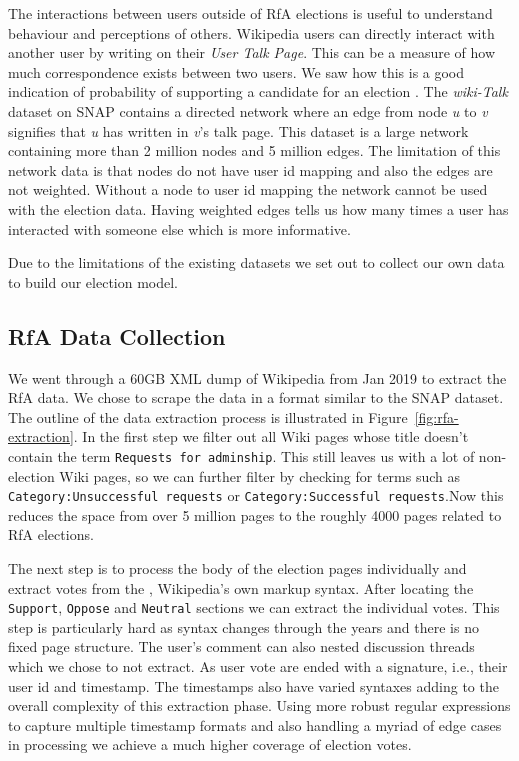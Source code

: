 The interactions between users outside of RfA elections is useful to understand behaviour and perceptions of others. Wikipedia users can directly interact with another user by writing on their \textit{User Talk Page}. This can be a measure of how much correspondence exists between two users. We saw how this is a good indication of probability of supporting a candidate for an election \cite{leskovec2010governance}. The \textit{wiki-Talk} dataset on SNAP contains a directed network where an edge from node \textit{u} to \textit{v} signifies that \textit{u} has written in \textit{v}'s talk page. This dataset is a large network containing more than 2 million nodes and 5 million edges. The limitation of this network data is that nodes do not have user id mapping and also the edges are not weighted. Without a node to user id mapping the network cannot be used with the election data. Having weighted edges tells us how many times a user has interacted with someone else which is more informative. 
\smallskip

Due to the limitations of the existing datasets we set out to collect our own data to build our election model.

\subsection{RfA Data Collection}

We went through a 60GB XML dump of Wikipedia from Jan 2019 to extract the RfA data. We chose to scrape the data in a format similar to the SNAP \wikirfa dataset. The outline of the data extraction process is illustrated in Figure~\ref{fig:rfa-extraction}. In the first step we filter out all Wiki pages whose title doesn't contain the term \texttt{Requests for adminship}. This still leaves us with a lot of non-election Wiki pages, so we can further filter by checking for terms such as \texttt{Category:Unsuccessful requests} or \texttt{Category:Successful requests}.Now this reduces the space from over 5 million pages to the roughly 4000 pages related to RfA elections.

The next step is to process the body of the election pages individually and extract votes from the \wikitalk, Wikipedia's own markup syntax. After locating the \texttt{Support}, \texttt{Oppose} and \texttt{Neutral} sections we can extract the individual votes. This step is particularly hard as \wikitalk syntax changes through the years and there is no fixed page structure. The user's comment can also nested discussion threads which we chose to not extract. As user vote are ended with a signature, i.e., their user id and timestamp. The timestamps also have varied syntaxes adding to the overall complexity of this extraction phase. Using more robust regular expressions to capture multiple timestamp formats and also handling a myriad of edge cases in processing we achieve a much higher coverage of election votes. 

